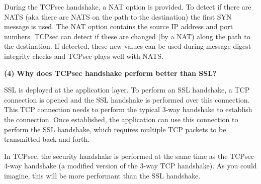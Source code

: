\documentclass[11pt]{article}
\renewcommand\part[1]{\vspace{.10in}\textbf{(#1)}}
\begin{document}
During the TCPsec handshake, a NAT option is provided. To detect if there are NATS (aka there are NATS on the path to the destination) the first SYN message is used. The NAT option contains the source IP address and port numbers. TCPsec can detect if these are changed (by a NAT) along the path to the destination. If detected, these new values can be used during message digest integrity checks and TCPsec plays well with NATS.

\part{4} \textbf{Why does TCPsec handshake perform better than SSL?}

SSL is deployed at the application layer. To perform an SSL handshake, a TCP connection is opened and the SSL handshake is performed over this connection. This TCP connection needs to perform the typical 3-way handshake to establish the connection. Once established, the application can use this connection to perform the SSL handshake, which requires multiple TCP packets to be transmitted back and forth.

In TCPsec, the security handshake is performed at the same time as the TCPsec 4-way handshake (a modified version of the 3-way TCP handshake). As you could imagine, this will be more performant than the SSL handshake.
\end{document}
